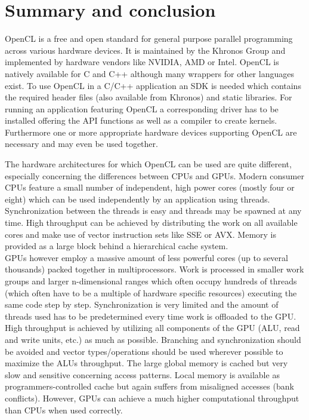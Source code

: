 \section{Summary and conclusion}

OpenCL is a free and open standard for general purpose parallel programming across various hardware devices. It is maintained by the Khronos Group and implemented by hardware vendors like NVIDIA, AMD or Intel. OpenCL is natively available for C and C++ although many wrappers for other languages exist. To use OpenCL in a C/C++ application an SDK is needed which contains the required header files (also available from Khronos) and static libraries. For running an application featuring OpenCL a corresponding driver has to be installed offering the API functions as well as a compiler to create kernels. Furthermore one or more appropriate hardware devices supporting OpenCL are necessary and may even be used together.

The hardware architectures for which OpenCL can be used are quite different, especially concerning the differences between CPUs and GPUs.
Modern consumer CPUs feature a small number of independent, high power cores (mostly four or eight) which can be used independently by an application using threads. Synchronization between the threads is easy and threads may be spawned at any time. High throughput can be achieved by distributing the work on all available cores and make use of vector instruction sets like SSE or AVX. Memory is provided as a large block behind a hierarchical cache system. \\
GPUs however employ a massive amount of less powerful cores (up to several thousands) packed together in multiprocessors. Work is processed in smaller work groups and larger n-dimensional ranges which often occupy hundreds of threads (which often have to be a multiple of hardware specific resources) executing the same code step by step. Synchronization is very limited and the amount of threads used has to be predetermined every time work is offloaded to the GPU. High throughput is achieved by utilizing all components of the GPU (ALU, read and write units, etc.) as much as possible. Branching and synchronization should be avoided and vector types/operations should be used wherever possible to maximize the ALUs throughput. The large global memory is cached but very slow and sensitive concerning access patterns. Local memory is available as programmers-controlled cache but again suffers from misaligned accesses (bank conflicts). However, GPUs can achieve a much higher computational throughput than CPUs when used correctly.

